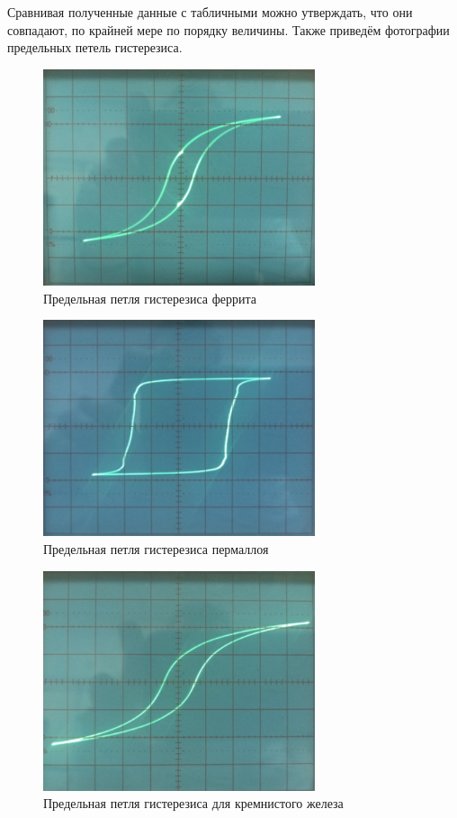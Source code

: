 \documentclass[a4paper,12pt]{article} %
\begin{document}
Сравнивая полученные данные с табличными можно утверждать, что они совпадают, по крайней мере по порядку величины. Также приведём фотографии предельных петель гистерезиса.

\begin{figure}[h!]
	\centering
	\includegraphics[width=8cm]{ferrit.jpg}
	\caption{Предельная петля гистерезиса феррита}
\end{figure}
\begin{figure}[h!]
	\centering
	\includegraphics[width=8cm]{permalloi.jpg}
	\caption{Предельная петля гистерезиса пермаллоя}
\end{figure}
\newpage
\begin{figure}[h!]
	\centering
	\includegraphics[width=8cm]{Si_Fe.jpg}
	\caption{Предельная петля гистерезиса для кремнистого железа}
\end{figure}
\end{document}
